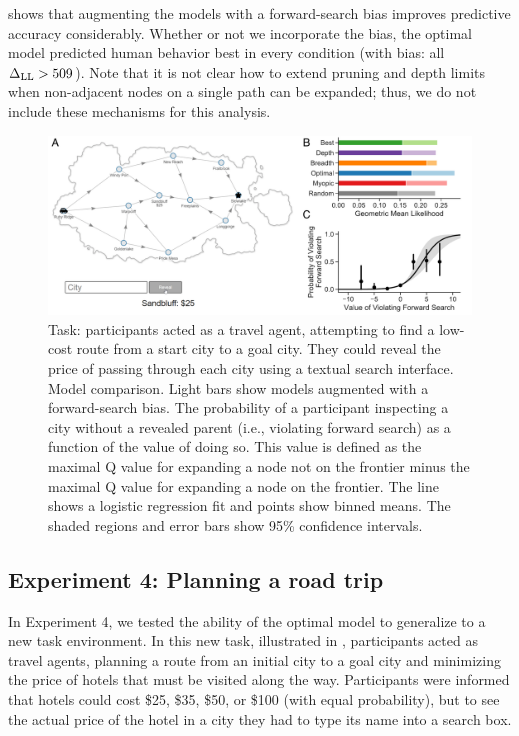  shows that augmenting the models with a forward-search bias improves predictive accuracy considerably. Whether or not we incorporate the bias, the optimal model predicted human behavior best in every condition (with bias: all $\Delta_{\mathrm{LL}} > 509$). Note that it is not clear how to extend pruning and depth limits when non-adjacent nodes on a single path can be expanded; thus, we do not include these mechanisms for this analysis.


\begin{figure}[t!]
  \centering
  \includegraphics[width=\textwidth]{figs/planning/fig6.pdf}
  \caption{ 
     Task: participants acted as a travel agent, attempting to find a low-cost route from a start city to a goal city. They could reveal the price of passing through each city using a textual search interface.
     Model comparison. Light bars show models augmented with a forward-search bias.
     The probability of a participant inspecting a city without a revealed parent (i.e., violating forward search) as a function of the value of doing so. This value is defined as the maximal Q value for expanding a node not on the frontier minus the maximal Q value for expanding a node on the frontier. The line shows a logistic regression fit and points show binned means. The shaded regions and error bars show 95\% confidence intervals.
  }
  \label{fig:planning-exp4}
\end{figure}


\subsection{Experiment 4: Planning a road trip}\label{sec:planning-results4}

In Experiment 4, we tested the ability of the optimal model to generalize to a new task environment. In this new task, illustrated in , participants acted as travel agents, planning a route from an initial city to a goal city and minimizing the price of hotels that must be visited along the way. Participants were informed that hotels could cost \$25, \$35, \$50, or \$100 (with equal probability), but to see the actual price of the hotel in a city they had to type its name into a search box.

